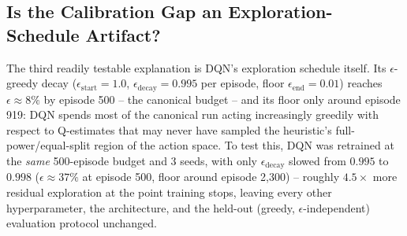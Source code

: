 \subsection{Is the Calibration Gap an Exploration-Schedule Artifact?}
\label{sec:oran-exploration-schedule-check}

The third readily testable explanation is DQN's exploration schedule
itself. Its $\epsilon$-greedy decay ($\epsilon_{\text{start}}=1.0$,
$\epsilon_{\text{decay}}=0.995$ per episode, floor $\epsilon_{\text{end}}=0.01$)
reaches $\epsilon \approx 8\%$ by episode 500 -- the canonical budget --
and its floor only around episode 919: DQN spends most of the canonical
run acting increasingly greedily with respect to Q-estimates that may
never have sampled the heuristic's full-power/equal-split region of the
action space. To test this, DQN was retrained at the \emph{same}
500-episode budget and 3 seeds, with only $\epsilon_{\text{decay}}$
slowed from $0.995$ to $0.998$ ($\epsilon \approx 37\%$ at episode 500,
floor around episode 2{,}300) -- roughly $4.5\times$ more residual
exploration at the point training stops, leaving every other
hyperparameter, the architecture, and the held-out (greedy,
$\epsilon$-independent) evaluation protocol unchanged.

\begin{table}[htbp]
\centering
\caption{DQN with its exploration decay slowed ($\epsilon_{\text{decay}}:
  0.995 \to 0.998$) vs.\ the canonical 500-episode run, against the
  heuristic and oracle reference policies.}
\label{tab:oran-exploration-schedule-check}
\end{table}

